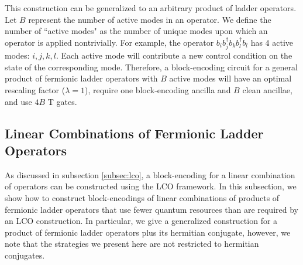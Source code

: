 This construction can be generalized to an arbitrary product of ladder operators.
Let $B$ represent the number of active modes in an operator.
We define the number of ``active modes" as the number of unique modes upon which an operator is applied nontrivially.
For example, the operator $b_i b_j^\dagger b_k b_l^\dagger b_l$ has $4$ active modes: $i, j, k, l$.
Each active mode will contribute a new control condition on the state of the corresponding mode.
Therefore, a block-encoding circuit for a general product of fermionic ladder operators with $B$ active modes will have an optimal rescaling factor ($\lambda = 1$), require one block-encoding ancilla and $B$ clean ancillae, and use $4B$ T gates.


\subsection{Linear Combinations of Fermionic Ladder Operators}

As discussed in subsection \ref{subsec:lco}, a block-encoding for a linear combination of operators can be constructed using the LCO framework.
In this subsection, we show how to construct block-encodings of linear combinations of products of fermionic ladder operators that use fewer quantum resources than are required by an LCO construction.
In particular, we give a generalized construction for a product of fermionic ladder operators plus its hermitian conjugate, however, we note that the strategies we present here are not restricted to hermitian conjugates.



